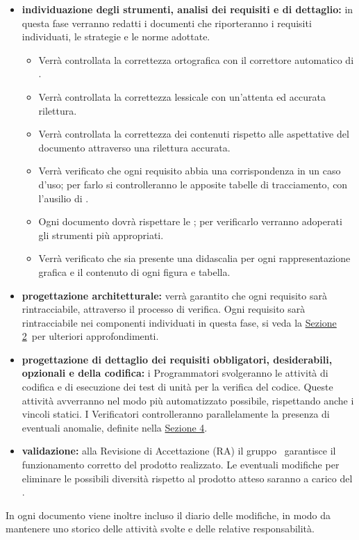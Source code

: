 		\begin{itemize}
			\item \textbf{individuazione degli strumenti, analisi dei requisiti e di dettaglio:} in questa fase verranno redatti i documenti che riporteranno i requisiti individuati, le strategie e le norme adottate.
			\begin{itemize}
				\item Verrà controllata la correttezza ortografica con il correttore automatico di .
				\item Verrà controllata la correttezza lessicale con un'attenta ed accurata rilettura.
				\item Verrà controllata la correttezza dei contenuti rispetto alle aspettative del documento attraverso una rilettura accurata.
				\item Verrà verificato che ogni requisito abbia una corrispondenza in un caso d'uso; per farlo si controlleranno le apposite tabelle di tracciamento, con l'ausilio di .
				\item Ogni documento dovrà rispettare le \NPdoc; per verificarlo verranno adoperati gli strumenti più appropriati.
				\item Verrà verificato che sia presente una didascalia per ogni rappresentazione grafica e il contenuto di ogni figura e tabella.
			\end{itemize}
			\item \textbf{progettazione architetturale:} verrà garantito che ogni requisito sarà rintracciabile, attraverso il processo di verifica. Ogni requisito sarà rintracciabile nei componenti individuati in questa fase, si veda la \hyperref[sec:Definizione]{Sezione 2}\ per ulteriori approfondimenti.
			\item \textbf{progettazione di dettaglio dei requisiti obbligatori, desiderabili, opzionali e della codifica:} i Programmatori svolgeranno le attività di codifica e di esecuzione dei test di unità per la verifica del codice. Queste attività avverranno nel modo più automatizzato possibile, rispettando anche i vincoli statici. I Verificatori controlleranno parallelamente la presenza di eventuali anomalie, definite nella \hyperref[sec:Gestione]{Sezione 4}.
			\item \textbf{validazione:} alla Revisione di Accettazione (RA) il gruppo \AUTORE\ garantisce il funzionamento corretto del prodotto realizzato. Le eventuali modifiche per eliminare le possibili diversità rispetto al prodotto atteso saranno a carico del .
		\end{itemize}
		In ogni documento viene inoltre incluso il diario delle modifiche, in modo da mantenere uno storico delle attività svolte e delle relative responsabilità.
